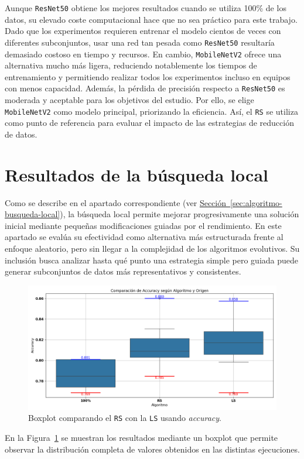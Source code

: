 Aunque \texttt{ResNet50} obtiene los mejores resultados cuando se utiliza 100\% de los datos,
su elevado coste computacional hace que no sea práctico para este trabajo.
Dado que los experimentos requieren entrenar el modelo cientos de veces con diferentes subconjuntos,
usar una red tan pesada como \texttt{ResNet50} resultaría demasiado costoso en tiempo y recursos.
En cambio, \texttt{MobileNetV2} ofrece una alternativa mucho más ligera,
reduciendo notablemente los tiempos de entrenamiento y permitiendo realizar todos los experimentos incluso en equipos con menos capacidad.
Además, la pérdida de precisión respecto a \texttt{ResNet50} es moderada y aceptable para los objetivos del estudio.
Por ello, se elige \texttt{MobileNetV2} como modelo principal, priorizando la eficiencia.
Así, el \texttt{RS} se utiliza como punto de referencia para evaluar el impacto de las estrategias de reducción de datos.


\section{Resultados de la búsqueda local}\label{sec:resultados-busqueda-local}
Como se describe en el apartado correspondiente (ver \hyperref[sec:algoritmo-busqueda-local]{Sección~\ref*{sec:algoritmo-busqueda-local}}),
la búsqueda local permite mejorar progresivamente una solución inicial mediante pequeñas modificaciones guiadas por el rendimiento.
En este apartado se evalúa su efectividad como alternativa más estructurada frente al enfoque aleatorio, pero sin llegar a la complejidad de los algoritmos evolutivos.
Su inclusión busca analizar hasta qué punto una estrategia simple pero guiada puede generar subconjuntos de datos más representativos y consistentes.

\begin{figure}[htp]
  \centering
  \includegraphics[width=1\textwidth]{imagenes/evaluaciones/comparacion_rs-ls.png}
  \caption{Boxplot comparando el \texttt{RS} con la \texttt{LS} usando \textit{accuracy}.}
  \label{fig:aleatorio-vs-busqueda-local}
\end{figure}
En la Figura~\ref{fig:aleatorio-vs-busqueda-local} se muestran los resultados mediante un boxplot que permite observar
la distribución completa de valores obtenidos en las distintas ejecuciones.

